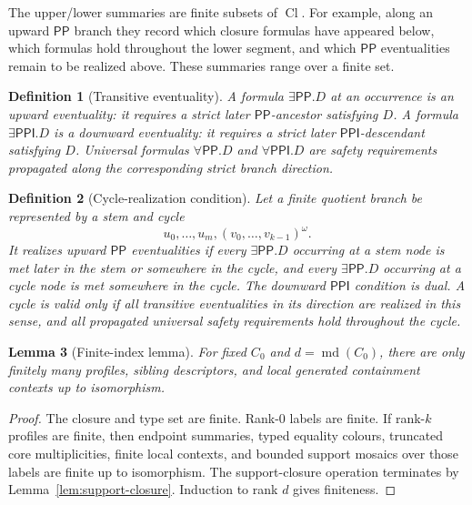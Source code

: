 \documentclass[11pt]{article}
\newtheorem{definition}{Definition}[section]
\newtheorem{lemma}[definition]{Lemma}
\theoremstyle{remark}
\newcommand{\PP}{\mathsf{PP}}
\newcommand{\PPI}{\mathsf{PPI}}
\newcommand{\Cl}{\operatorname{Cl}}
\newcommand{\md}{\operatorname{md}}
\begin{document}
The upper/lower summaries are finite subsets of $\Cl$.  For example, along an upward $\PP$ branch they record which closure formulas have appeared below, which formulas hold throughout the lower segment, and which $\PP$ eventualities remain to be realized above.  These summaries range over a finite set.

\begin{definition}[Transitive eventuality]
A formula $\exists\PP.D$ at an occurrence is an upward eventuality: it requires a strict later $\PP$-ancestor satisfying $D$.  A formula $\exists\PPI.D$ is a downward eventuality: it requires a strict later $\PPI$-descendant satisfying $D$.  Universal formulas $\forall\PP.D$ and $\forall\PPI.D$ are safety requirements propagated along the corresponding strict branch direction.
\end{definition}

\begin{definition}[Cycle-realization condition]\label{def:cycle-realization}
Let a finite quotient branch be represented by a stem and cycle
\[
u_0,\ldots,u_m,(v_0,\ldots,v_{k-1})^\omega.
\]
It realizes upward $\PP$ eventualities if every $\exists\PP.D$ occurring at a stem node is met later in the stem or somewhere in the cycle, and every $\exists\PP.D$ occurring at a cycle node is met somewhere in the cycle.  The downward $\PPI$ condition is dual.  A cycle is valid only if all transitive eventualities in its direction are realized in this sense, and all propagated universal safety requirements hold throughout the cycle.
\end{definition}

\begin{lemma}[Finite-index lemma]\label{lem:finite-index}
For fixed $C_0$ and $d=\md(C_0)$, there are only finitely many profiles, sibling descriptors, and local generated containment contexts up to isomorphism.
\end{lemma}
\begin{proof}
The closure and type set are finite.  Rank-$0$ labels are finite.  If rank-$k$ profiles are finite, then endpoint summaries, typed equality colours, truncated core multiplicities, finite local contexts, and bounded support mosaics over those labels are finite up to isomorphism.  The support-closure operation terminates by Lemma~\ref{lem:support-closure}.  Induction to rank $d$ gives finiteness.
\end{proof}
\end{document}

